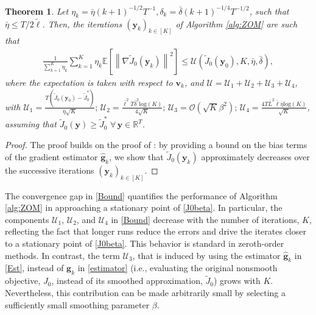 \documentclass[letterpaper, 10 pt, conference]{ieeeconf}
\newcommand{\real}{\mathbb{R}}
\newcommand\gbf{\mathbf{g}}
\newcommand\vbf{\mathbf{v}}
\newcommand\ybf{\mathbf{y}}
\newtheorem{theorem}{Theorem}
\begin{document}
\begin{theorem}\label{TheoBound}
    Let $\eta_k=\bar{\eta}(k+1)^{-1/2}T^{-1}, \delta_k=\bar{\delta}(k+1)^{-1/4}T^{-1/2}$, such that $\bar{\eta}\le T/2 \tilde{\ell}$. Then, the iterations $\left(\ybf_k\right)_{k \in [K]}$ of Algorithm \ref{alg:ZOM} are such that
    \begin{align}\label{Bound}
        \frac{1}{\sum_{k=1}^K \eta_k} \sum_{k=1}^K \eta_k \mathbb{E}\left[\left\|\nabla \tilde{J}_0(\ybf_k)\right\|^2\right]\le \mathcal{U}(\tilde{J}_0(\ybf_0),K,\bar{\eta}, \bar{\delta}),
    \end{align}
    where the expectation is taken with respect to $\vbf_k$, and $\mathcal{U}=\mathcal{U}_1 + \mathcal{U}_2+\mathcal{U}_3+\mathcal{U}_4$, with $\mathcal{U}_1=\frac{T (\tilde{J}_0(\ybf_0)-\tilde{J}_0^*)}{\bar{\eta}\sqrt{K}};\, \mathcal{U}_2=\frac{\bar{\ell}^2T \bar{\delta}^2 \mathrm{log}(K)}{4 \sqrt{K}};\, \mathcal{U}_3=\mathcal{O}(\sqrt{K}\beta^2);\,\mathcal{U}_4=\frac{4T\bar{L}^2\bar{\ell}\bar{\eta}\mathrm{log}(K)}{\sqrt{K}}$, assuming that $\tilde{J}_0(\ybf)\ge\tilde{J}^*_0 \,\,\forall \, \ybf \in \real^T$.
\end{theorem}
\begin{proof}
    The proof builds on the proof of \cite[Theorem 1]{maheshwari2024follower}: by providing a bound on the bias terms of the gradient estimator $\hat{\gbf}_k$, we show that $\tilde{J}_0(\ybf_k)$ approximately decreases over the successive iterations $\left(\ybf_k\right)_{k \in [K]}$.
\end{proof}
The convergence gap in \eqref{Bound} quantifies the performance of Algorithm \ref{alg:ZOM} in approaching a stationary point of \eqref{J0beta}. In particular, the components $\mathcal{U}_1, \, \mathcal{U}_2$, and $\mathcal{U}_4$ in \eqref{Bound} decrease with the number of iterations, $K$, reflecting the fact that longer runs reduce the errors and drive the iterates closer to a stationary point of \eqref{J0beta}. This behavior is standard in zeroth-order methods. In contrast, the term $\mathcal{U}_3$, that is induced by using the estimator $\hat{\gbf}_k$ in \eqref{Est}, instead of $\gbf_k$ in \eqref{estimator} (i.e., evaluating the original nonsmooth objective, $J_0$, instead of its smoothed approximation, $\tilde{J}_0$) grows with $K$. Nevertheless, this contribution can be made arbitrarily small by selecting a sufficiently small smoothing parameter $\beta$.
\end{document}
